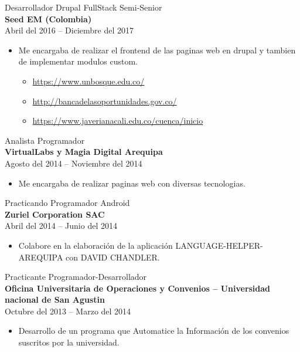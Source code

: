 \documentclass[letterpaper]{twentysecondcv} %
\begin{document}
{\Large Desarrollador Drupal FullStack Semi-Senior}\\
{\large \bf Seed EM (Colombia)}\\
{Abril del 2016 -- Diciembre del 2017}
\begin{itemize}
\item Me encargaba de realizar el frontend de las paginas web en drupal y tambien de implementar modulos custom. 
  \begin{itemize}
	\item {\url{https://www.unbosque.edu.co/}}
	\item {\url{http://bancadelasoportunidades.gov.co/}}
	\item {\url{https://www.javerianacali.edu.co/cuenca/inicio}}\\
  \end{itemize}
\end{itemize}


{\Large Analista Programador}\\
{\large \bf VirtualLabs y Magia Digital Arequipa}\\
{Agosto del 2014 -- Noviembre del 2014}
\begin{itemize}
\item Me encargaba de realizar paginas web con diversas tecnologias. \\
\end{itemize}


{\Large Practicando Programador Android}\\
{\large \bf Zuriel Corporation SAC}\\
{Abril del 2014 -- Junio del 2014}
\begin{itemize}
\item Colabore en la elaboración de la aplicación LANGUAGE-HELPER-AREQUIPA con DAVID CHANDLER.\\
\end{itemize}


{\Large Practicante Programador-Desarrollador}\\
{\large \bf Oficina Universitaria de Operaciones y Convenios – Universidad nacional de San Agustin}\\
{Octubre del 2013 -- Marzo del 2014}
\begin{itemize}
\item Desarrollo de un programa que Automatice la Información de los convenios suscritos por la universidad.\\  
\end{itemize}

\end{document}
